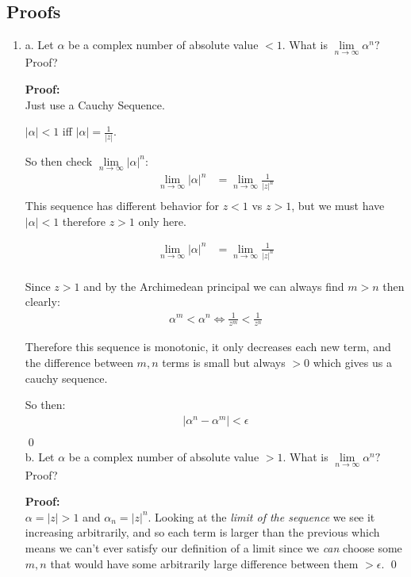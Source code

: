 \subsection{Proofs}
\begin{enumerate}
	\item 
	\subitem a. Let $\alpha$ be a complex number of absolute value $< 1.$ 
	What is $\lim\limits_{n \to \infty} \alpha^n ?$ Proof?

	\textbf{Proof:} \\
	Just use a Cauchy Sequence.

	$|\alpha| < 1$ iff $ |\alpha| = \frac{1}{|z|}.$ 

	So then check $\lim\limits_{n \to \infty} |\alpha|^n$:
	\begin{align*}
		\lim\limits_{n \to \infty} |\alpha|^n &= \lim\limits_{n \to \infty} \frac{1}{|z|^n} \\
	\end{align*}
	This sequence has different behavior for $z < 1$ vs $z > 1$, but we must have $|\alpha| < 1$ therefore $z > 1$ only here.

	\begin{align*}
		\lim\limits_{n \to \infty} |\alpha|^n &= \lim\limits_{n \to \infty} \frac{1}{|z|^n} \\
	\end{align*}

	Since $z > 1$ and by the Archimedean principal we can always find $m > n$
	then clearly: 
	\begin{align*}
	\alpha^m < \alpha^n \iff \frac{1}{z^m} < \frac{1}{z^n}
	\end{align*}
	
	Therefore this sequence is monotonic, it only decreases each new term, and the difference between $m, n$ terms is 
	small but always $> 0$ which gives us a cauchy sequence.

	So then:
	\begin{align*}
		|\alpha^n - \alpha^m| < \epsilon \\
	\end{align*} \qed
	\\
	\subitem b. Let $\alpha$ be a complex number of absolute value $> 1.$ 
	What is $\lim\limits_{n \to \infty} \alpha^n ?$ Proof?

	\textbf{Proof:} \\
	$ \alpha = |z| > 1$ and $\alpha_n = |z|^n.$ 
	Looking at the \textit{limit of the sequence} we see it increasing arbitrarily, and so each 
	term is larger than the previous which means we can't ever satisfy our definition of a limit 
	since we \textit{can} choose some $m, n$ that would have some arbitrarily large difference between 
	them $> \epsilon.$ \qed
	

\end{enumerate}
